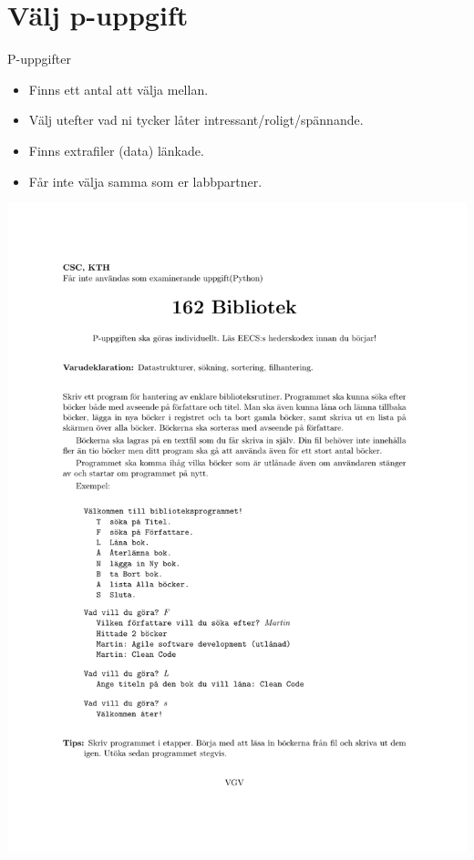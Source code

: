 \mode*

\section{Välj p-uppgift}

\begin{frame}
  \begin{block}{P-uppgifter}
    \begin{itemize}
      \item Finns ett antal att välja mellan.
      \item Välj utefter vad ni tycker låter intressant/roligt/spännande.
      \item Finns extrafiler (data) länkade.
    \end{itemize}
  \end{block}

  \pause

  \begin{remark}
    \begin{itemize}
      \item Får inte välja samma som er labbpartner.
    \end{itemize}
  \end{remark}
\end{frame}

\begin{frame}
  \includegraphics[width=\columnwidth]{exempel.pdf}
\end{frame}


